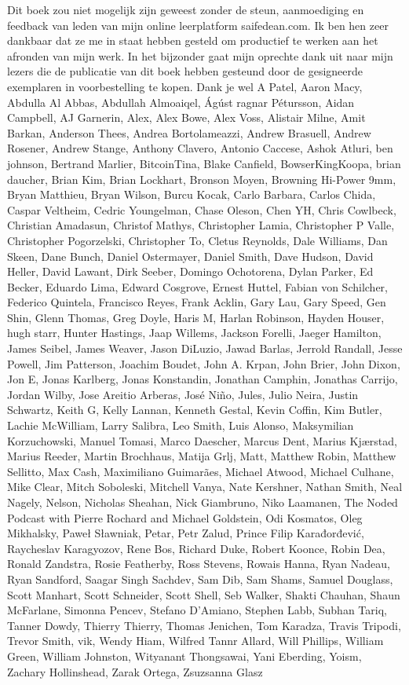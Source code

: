 Dit boek zou niet mogelijk zijn geweest zonder de steun, aanmoediging en feedback van leden van mijn online leerplatform saifedean.com. Ik ben hen zeer dankbaar dat ze me in staat hebben gesteld om productief te werken aan het afronden van mijn werk. In het bijzonder gaat mijn oprechte dank uit naar mijn lezers die de publicatie van dit boek hebben gesteund door de gesigneerde exemplaren in voorbestelling te kopen. Dank je wel A Patel, Aaron Macy, Abdulla Al Abbas, Abdullah Almoaiqel, Ágúst ragnar Pétursson, Aidan Campbell, AJ Garnerin, Alex, Alex Bowe, Alex Voss, Alistair Milne, Amit Barkan, Anderson Thees, Andrea Bortolameazzi, Andrew Brasuell, Andrew Rosener, Andrew Stange, Anthony Clavero, Antonio Caccese, Ashok Atluri, ben johnson, Bertrand Marlier, BitcoinTina, Blake Canfield, BowserKingKoopa, brian daucher, Brian Kim, Brian Lockhart, Bronson Moyen, Browning Hi-Power 9mm, Bryan Matthieu, Bryan Wilson, Burcu Kocak, Carlo Barbara, Carlos Chida, Caspar Veltheim, Cedric Youngelman, Chase Oleson, Chen YH, Chris Cowlbeck, Christian Amadasun, Christof Mathys, Christopher Lamia, Christopher P Valle, Christopher Pogorzelski, Christopher To, Cletus Reynolds, Dale Williams, Dan Skeen, Dane Bunch, Daniel Ostermayer, Daniel Smith, Dave Hudson, David Heller, David Lawant, Dirk Seeber, Domingo Ochotorena, Dylan Parker, Ed Becker, Eduardo Lima, Edward Cosgrove, Ernest Huttel, Fabian von Schilcher, Federico Quintela, Francisco Reyes, Frank Acklin, Gary Lau, Gary Speed, Gen Shin, Glenn Thomas, Greg Doyle, Haris M, Harlan Robinson, Hayden Houser, hugh  starr, Hunter Hastings, Jaap Willems, Jackson Forelli, Jaeger Hamilton, James Seibel, James Weaver, Jason DiLuzio, Jawad Barlas, Jerrold Randall, Jesse Powell, Jim Patterson, Joachim Boudet, John A. Krpan, John Brier, John Dixon, Jon E, Jonas Karlberg, Jonas Konstandin, Jonathan Camphin, Jonathas Carrijo, Jordan Wilby, Jose Areitio Arberas, José Niño, Jules, Julio Neira, Justin Schwartz, Keith G, Kelly Lannan, Kenneth Gestal, Kevin Coffin, Kim Butler, Lachie McWilliam, Larry Salibra, Leo Smith, Luis Alonso, Maksymilian Korzuchowski, Manuel Tomasi, Marco Daescher, Marcus Dent, Marius Kjærstad, Marius Reeder, Martin Brochhaus, Matija Grlj, Matt, Matthew Robin, Matthew Sellitto, Max Cash, Maximiliano Guimarães, Michael Atwood, Michael Culhane, Mike Clear, Mitch Soboleski, Mitchell Vanya, Nate Kershner, Nathan Smith, Neal Nagely, Nelson, Nicholas Sheahan, Nick Giambruno, Niko Laamanen, The Noded Podcast with Pierre Rochard and Michael Goldstein, Odi Kosmatos, Oleg Mikhalsky, Paweł Sławniak, Petar, Petr Zalud, Prince Filip Karađorđević, Raycheslav Karagyozov, Rene Bos, Richard Duke, Robert Koonce, Robin Dea, Ronald Zandstra, Rosie Featherby, Ross Stevens, Rowais Hanna, Ryan Nadeau, Ryan Sandford, Saagar Singh Sachdev, Sam Dib, Sam Shams, Samuel Douglass, Scott Manhart, Scott Schneider, Scott Shell, Seb Walker, Shakti Chauhan, Shaun McFarlane, Simonna Pencev, Stefano D'Amiano, Stephen Labb, Subhan Tariq, Tanner Dowdy, Thierry Thierry, Thomas Jenichen, Tom Karadza, Travis Tripodi, Trevor Smith, vik, Wendy Hiam, Wilfred Tannr Allard, Will Phillips, William Green, William Johnston, Wityanant Thongsawai, Yani Eberding, Yoism, Zachary Hollinshead, Zarak Ortega, Zsuzsanna Glasz